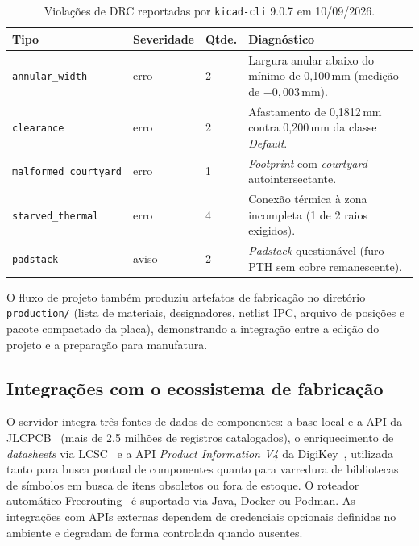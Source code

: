 \begin{table}[htbp]
\centering
\small
\caption{Violações de DRC reportadas por \texttt{kicad-cli} 9.0.7 em 10/09/2026.}
\label{tab:drc}
\begin{tabular}{@{}p{3.4cm}p{1.9cm}p{1.2cm}p{8.0cm}@{}}
\toprule
\textbf{Tipo} & \textbf{Severidade} & \textbf{Qtde.} & \textbf{Diagnóstico} \\
\midrule
\texttt{annular\_width} & erro & 2 & Largura anular abaixo do mínimo de 0,100\,mm (medição de $-0{,}003$\,mm). \\
\texttt{clearance} & erro & 2 & Afastamento de 0,1812\,mm contra 0,200\,mm da classe \emph{Default}. \\
\texttt{malformed\_courtyard} & erro & 1 & \emph{Footprint} com \emph{courtyard} autointersectante. \\
\texttt{starved\_thermal} & erro & 4 & Conexão térmica à zona incompleta (1 de 2 raios exigidos). \\
\texttt{padstack} & aviso & 2 & \emph{Padstack} questionável (furo PTH sem cobre remanescente). \\
\bottomrule
\end{tabular}
\end{table}

O fluxo de projeto também produziu artefatos de fabricação no diretório
\texttt{production/} (lista de materiais, designadores, netlist IPC, arquivo de
posições e pacote compactado da placa), demonstrando a integração entre a
edição do projeto e a preparação para manufatura.

\subsection{Integrações com o ecossistema de fabricação}

O servidor integra três fontes de dados de componentes: a base local e a API
da JLCPCB~\citep{jlcpcb} (mais de 2,5 milhões de registros catalogados), o
enriquecimento de \emph{datasheets} via LCSC~\citep{lcsc} e a API
\emph{Product Information V4} da DigiKey~\citep{digikey}, utilizada tanto para
busca pontual de componentes quanto para varredura de bibliotecas de símbolos
em busca de itens obsoletos ou fora de estoque. O roteador automático
Freerouting~\citep{freerouting} é suportado via Java, Docker ou Podman. As
integrações com APIs externas dependem de credenciais opcionais definidas no
ambiente e degradam de forma controlada quando ausentes.

